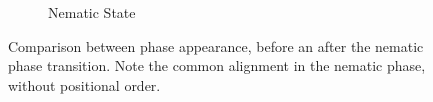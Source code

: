 \documentclass[11pt, a4paper]{article} %
\begin{document}
\begin{figure}[ht]
\begin{subfigure}{.42\textwidth}
		\caption{Nematic State}
		\label{fig:cubic_nematic}
	\end{subfigure}
	\caption{Comparison between phase appearance, before an after the nematic phase transition. Note the common alignment in the nematic phase, without positional order.}
	\label{fig:pitformation}
\end{figure}

\printbibliography
\end{document}
